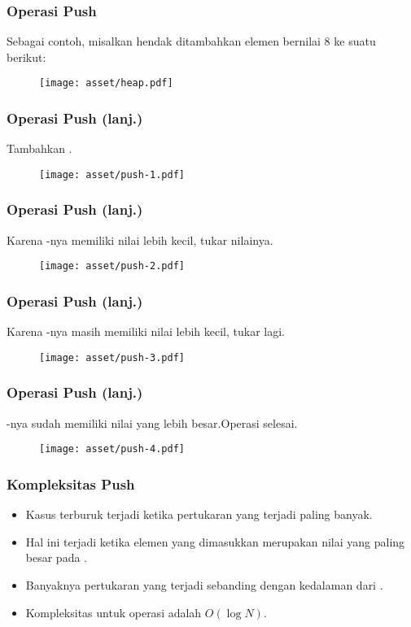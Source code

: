 \begin{frame}
\frametitle{Operasi Push}
Sebagai contoh, misalkan hendak ditambahkan elemen bernilai 8 ke suatu \pbinaryHeap berikut:
\begin{figure}
  \texttt{[image: asset/heap.pdf]}
\end{figure}
\end{frame}

\begin{frame}
\frametitle{Operasi Push (lanj.)}
Tambahkan \fnode.
\begin{figure}
  \texttt{[image: asset/push-1.pdf]}
\end{figure}
\end{frame}

\begin{frame}
\frametitle{Operasi Push (lanj.)}
Karena -nya memiliki nilai lebih kecil, tukar nilainya.
\begin{figure}
  \texttt{[image: asset/push-2.pdf]}
\end{figure}
\end{frame}

\begin{frame}
\frametitle{Operasi Push (lanj.)}
Karena -nya masih memiliki nilai lebih kecil, tukar lagi.
\begin{figure}
  \texttt{[image: asset/push-3.pdf]}
\end{figure}
\end{frame}

\begin{frame}
\frametitle{Operasi Push (lanj.)}
-nya sudah memiliki nilai yang lebih besar.\newline Operasi  selesai.
\begin{figure}
  \texttt{[image: asset/push-4.pdf]}
\end{figure}
\end{frame}

\begin{frame}
\frametitle{Kompleksitas Push}
\begin{itemize}
  \item Kasus terburuk terjadi ketika pertukaran yang terjadi paling banyak.
  \item Hal ini terjadi ketika elemen yang dimasukkan merupakan nilai yang paling besar pada \pheap.
  \item Banyaknya pertukaran yang terjadi sebanding dengan kedalaman dari .
  \item Kompleksitas untuk operasi  adalah $O(\log{N})$.
\end{itemize}
\end{frame}

